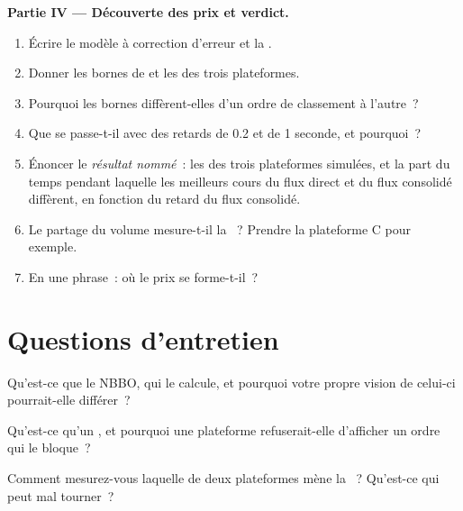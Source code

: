 \begin{problem}
\medskip\noindent\textbf{Partie IV --- Découverte des prix et verdict.}
\begin{enumerate}[resume]
\item Écrire le modèle à correction d'erreur et la .
\item Donner les bornes de  et les  des trois plateformes.
\item Pourquoi les bornes diffèrent-elles d'un ordre de classement à l'autre~?
\item Que se passe-t-il avec des retards de 0.2 et de 1 seconde, et pourquoi~?
\item Énoncer le \emph{résultat nommé}~: les  des trois plateformes simulées, et la part du temps pendant laquelle les meilleurs cours du flux direct et du flux consolidé
diffèrent, en fonction du retard du flux consolidé.
\item Le partage du volume mesure-t-il la ~? Prendre la plateforme C pour exemple.
\item En une phrase~: où le prix se forme-t-il~?
\end{enumerate}
\end{problem}

\section{Questions d'entretien}

\begin{interviewq}\label{iq:mx:fragmentation-and-routing:1}
Qu'est-ce que le NBBO, qui le calcule, et pourquoi votre propre vision de celui-ci pourrait-elle différer~?
\end{interviewq}

\begin{interviewq}\label{iq:mx:fragmentation-and-routing:2}
Qu'est-ce qu'un , et pourquoi une plateforme refuserait-elle d'afficher un ordre qui le bloque~?
\end{interviewq}

\begin{interviewq}\label{iq:mx:fragmentation-and-routing:3}
Comment mesurez-vous laquelle de deux plateformes mène la ~? Qu'est-ce qui peut mal tourner~?
\end{interviewq}

